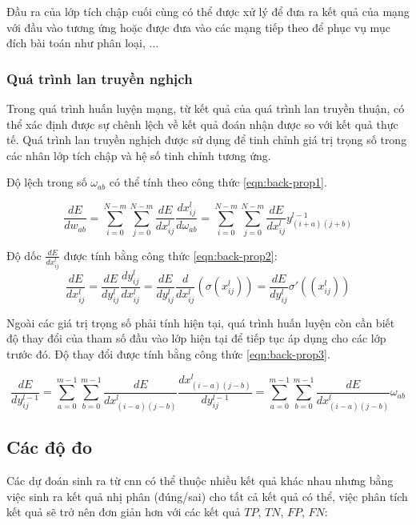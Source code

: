 Đầu ra của lớp tích chập cuối cùng có thể được xử lý để đưa ra kết quả của mạng với đầu vào tương ứng hoặc được đưa vào các mạng tiếp theo để phục vụ mục đích bài toán như phân loại, ...



\subsubsection{Quá trình lan truyền nghịch}
Trong quá trình huấn luyện mạng, từ kết quả của quá trình lan truyền thuận, có thể xác định được sự chênh lệch về kết quả đoán nhận được so với kết quả thực tế. Quá trình lan truyền nghịch được sử dụng để tinh chỉnh giá trị trọng số trong các nhân lớp tích chập và hệ số tinh chỉnh tương ứng. 

Độ lệch trong số $\omega_{ab}$ có thể tính theo công thức \ref{eqn:back-prop1}.

\begin{equation}\label{eqn:back-prop1}
	\frac{dE}{dw_{ab}} = \sum^{N-m}_{i=0}\sum^{N-m}_{j=0} \frac{dE}{dx^l_{ij}} \frac{dx^l_{ij}}{d\omega_{ab}} =  \sum^{N-m}_{i=0}\sum^{N-m}_{j=0} \frac{dE}{dx^l_{ij}} y^{l-1}_{(i+a)(j+b)}
\end{equation}

Độ dốc $\frac{dE}{dx^l_{ij}}$ được tính bằng công thức \ref{eqn:back-prop2}:
\begin{equation}\label{eqn:back-prop2}
	\frac{dE}{dx^l_{ij}} = \frac{dE}{dy^l_{ij}}\frac{dy^l_{ij}}{dx^l_{ij}} =  \frac{dE}{dy^l_{ij}} \frac{d}{dx^l_{ij}}(\sigma (x^l_{ij})) = \frac{dE}{dy^l_{ij}}\sigma' ((x^l_{ij}))
\end{equation}

Ngoài các giá trị trọng số phải tính hiện tại, quá trình huấn luyện còn cần biết độ thay đổi của tham số đầu vào lớp hiện tại để tiếp tục áp dụng cho các lớp trước đó. Độ thay đổi được tính bằng công thức \ref{eqn:back-prop3}.

\begin{equation}\label{eqn:back-prop3}
	\frac{dE}{dy^{l-1}_{ij}} = \sum^{m-1}_{a=0} \sum^{m-1}_{b=0} \frac{dE}{dx^l_{(i-a)(j-b)}} \frac{dx^l_{(i-a)(j-b)}}{dy^{l-1}_{ij}} = \sum^{m-1}_{a=0} \sum^{m-1}_{b=0} \frac{dE}{dx^l_{(i-a)(j-b)}}\omega_{ab}
\end{equation}

\subsection{Các độ đo}
Các dự đoán sinh ra từ \acrshort{cnn} có thể thuộc nhiều kết quả khác nhau nhưng bằng việc sinh ra kết quả nhị phân (đúng/sai) cho tất cả kết quả có thể, việc phân tích kết quả sẽ trở nên đơn giản hơn với các kết quả $TP$, $TN$, $FP$, $FN$:

